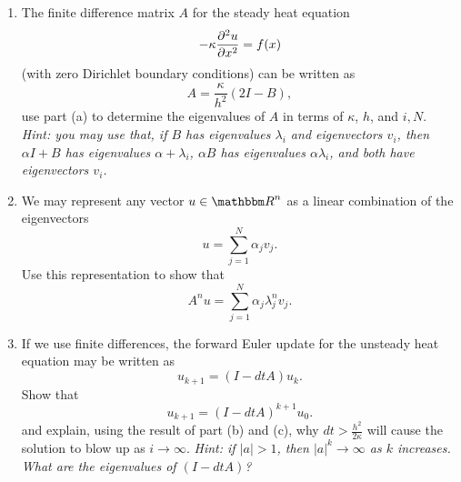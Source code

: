\begin{enumerate}
\item The finite difference matrix $A$ for the steady heat equation
\[
-\kappa \frac{\partial^{2} u}{\partial x^{2}} = f(x)
\]
(with zero Dirichlet boundary conditions) can be written as
\[
A = \frac{\kappa}{h^2}(2I - B),
\] 
use part (a) to determine the eigenvalues of $A$ in terms of $\kappa$, $h$, and $i, N$.  \emph{Hint: you may use that, if $B$ has eigenvalues $\lambda_i$ and eigenvectors $v_i$, then $\alpha I + B$ has eigenvalues $\alpha + \lambda_i$, $\alpha B$ has eigenvalues $\alpha \lambda_i$, and both have eigenvectors $v_i$.  }
\item We may represent any vector $u \in \R^n$ as a linear combination of the eigenvectors 
\[
u  = \sum_{j=1}^N \alpha_j v_j.
\]
Use this representation to show that 
\[
A^n u = \sum_{j=1}^N \alpha_j \lambda_j^n v_j.  
\]
\item If we use finite differences, the forward Euler update for the unsteady heat equation may be written as
\[
u_{k+1} = (I - dt A)u_k.
\]
Show that 
\[
u_{k+1} = (I - dt A)^{k+1}u_0.
\]
and explain, using the result of part (b) and (c), why $dt > \frac{h^2}{2\kappa}$  will cause the solution to blow up as $i\rightarrow \infty$.  \emph{Hint: if $|a| > 1$, then $|a|^k \rightarrow \infty$ as $k$ increases.  What are the eigenvalues of $(I-dt A)$?}

\end{enumerate}


